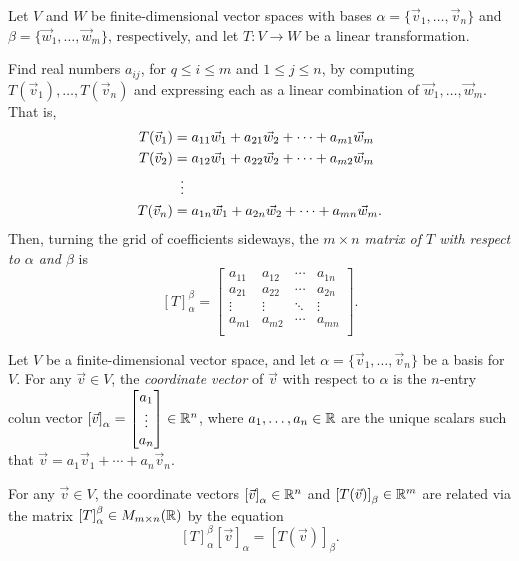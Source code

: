 \begin{definition}
	Let $V$ and $W$ be finite-dimensional vector spaces with bases $\alpha =
	\{\vec{v}_1, \dots, \vec{v}_n\}$ and $\beta = \{\vec{w}_1, \dots,
	\vec{w}_m\}$, respectively, and let $T : V \rightarrow W$ be a linear
	transformation.

	Find real numbers $a_{ij}$, for $q \leq i \leq m$ and $1 \leq j \leq n$, by
	computing $T(\vec{v}_1), \dots, T(\vec{v}_n)$ and expressing each as a linear
	combination of $\vec{w}_1, \dots, \vec{w}_m$. That is,
	\begin{align*}
		T(\vec{v}_1) &= a_{11} \vec{w}_1 + a_{21} \vec{w}_2 + \cdots + a_{m1}
		\vec{w}_m \\
		T(\vec{v}_2) &= a_{12} \vec{w}_1 + a_{22} \vec{w}_2 + \cdots + a_{m2}
		\vec{w}_m \\
		&\vdotswithin{=} \\
		T(\vec{v}_n) &= a_{1n} \vec{w}_1 + a_{2n} \vec{w}_2 + \cdots + a_{mn}
		\vec{w}_m.
	\end{align*}
	Then, turning the grid of coefficients sideways, the \emph{$m \times n$ matrix
	of $T$ with respect to $\alpha$ and $\beta$} is
	\[
		{[T]}_\alpha^\beta =
		\begin{bmatrix}
			a_{11} & a_{12} & \cdots & a_{1n} \\
			a_{21} & a_{22} & \cdots & a_{2n} \\
			\vdots & \vdots & \ddots & \vdots \\
			a_{m1} & a_{m2} & \cdots & a_{mn} \\
		\end{bmatrix}.
	\]
\end{definition}

\begin{definition}
	Let $V$ be a finite-dimensional vector space, and let $\alpha = \{\vec{v}_1,
	\dots, \vec{v}_n\}$ be a basis for $V$. For any $\vec{v} \in V$, the
	\emph{coordinate vector} of $\vec{v}$ with respect to $\alpha$ is the
	$n$-entry colun vector ${[\vec{v}]}_\alpha =
	\begin{bmatrix}
		a_1 \\
		\vdots \\
		a_n
	\end{bmatrix} \in {\mathbb{R}}^n$,
	where $a_1, \dots, a_n \in {\mathbb{R}}$ are the unique scalars such that $\vec{v} = a_1
	\vec{v}_1 + \cdots + a_n \vec{v}_n$.
\end{definition}

\begin{fact}
	For any $\vec{v} \in V$, the coordinate vectors ${[\vec{v}]}_\alpha \in {\mathbb{R}}^n$
	and ${[T(\vec{v})]}_\beta \in {\mathbb{R}}^m$ are related via the matrix
	${[T]}_\alpha^\beta \in M_{m \times n}({\mathbb{R}})$ by the equation
	\[
		{[T]}_\alpha^\beta {[\vec{v}]}_\alpha = {[T(\vec{v})]}_\beta.
	\]
\end{fact}

